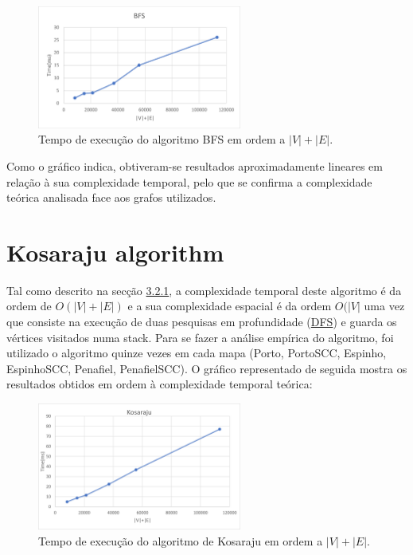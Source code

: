\documentclass[12pt,a4paper]{report}
\begin{document}
\begin{figure}[H]
	\includegraphics[width=0.6\textwidth]{./imgs/charts/BFSTimeComplexity.png}
	\centering
	\caption{Tempo de execução do algoritmo BFS em ordem a $|V|+|E|$.}
\end{figure}


Como o gráfico indica, obtiveram-se resultados aproximadamente lineares em relação à sua complexidade temporal, pelo que se confirma a complexidade teórica
analisada face aos grafos utilizados.


\section{Kosaraju algorithm}
Tal como descrito na secção \hyperref[algo:kosaraju]{3.2.1}, a complexidade temporal deste algoritmo é da ordem de \( O(|V| + |E|) \) e a sua complexidade espacial 
é da ordem \(O(|V|\) uma vez que consiste na execução de duas pesquisas em profundidade (\hyperref[algo:dfs]{DFS}) e guarda os vértices visitados numa stack.
Para se fazer a análise empírica do algoritmo, foi utilizado o algoritmo quinze vezes em cada mapa (Porto, PortoSCC, Espinho, EspinhoSCC, Penafiel, PenafielSCC).
O gráfico representado de seguida mostra os resultados obtidos em ordem à complexidade temporal teórica:

\begin{figure}[H]
	\includegraphics[width=0.6\textwidth]{./imgs/charts/KosarajuTimeComplexity.png}
	\centering
	\caption{Tempo de execução do algoritmo de Kosaraju em ordem a $|V|+|E|$.}
\end{figure}
\end{document}
